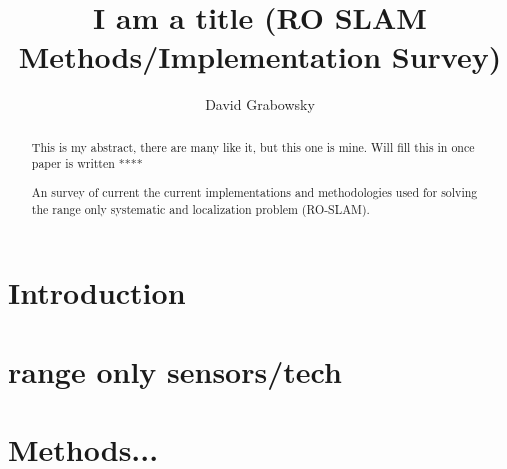 \documentclass[conference]{IEEEtran}
\begin{document}
	\title{I am a title (RO SLAM Methods/Implementation Survey) }

	\author{David Grabowsky}
	
	
	
	
	\maketitle
	
	
\begin{abstract}

	
	This is my abstract, there are many like it, but this one is mine. Will fill this in once paper is written ****
	
	An survey of current the current implementations and methodologies used for solving the range only systematic and localization problem (RO-SLAM). 

\end{abstract}
	
	
	
\section{Introduction} 

\section{range only sensors/tech}
\section{Methods...}
\end{document}
